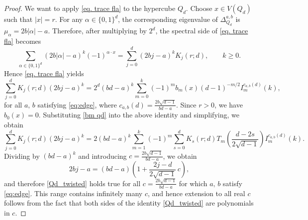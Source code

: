 \documentclass[reqno,10pt]{amsart}
\theoremstyle{definition}
\numberwithin{equation}{section}
\begin{document}
\begin{proof}
We want to apply \eqref{eq. trace fla} to the hypercube $Q_d$. Choose
$x\in V(Q_d)$ such that $|x|=r$.  For any
$\alpha\in\{0,1\}^d$, the corresponding eigenvalue of
$\Delta_{Q_d}^{a,b}$ is $\mu_\alpha=2b|\alpha|-a$. Therefore, after multiplying
by $2^d$, the spectral side of \eqref{eq. trace fla} becomes
\[
\sum_{\alpha\in\{0,1\}^d}
(2b|\alpha|-a)^k(-1)^{\alpha\cdot x}
=
\sum_{j=0}^{d}
(2bj-a)^kK_j(r;d),
\qquad k\ge0.
\]
Hence \eqref{eq. trace fla} yields 
\[
\sum_{j=0}^{d}
K_j(r;d)(2bj-a)^k
=
2^d(bd-a)^k
\sum_{m=0}^{k}
(-1)^m
b_m(x)
(d-1)^{-m/2}
I_m^{c_{a,b}(d)}(k),
\]
for all $a,\, b$ satisfying \eqref{eq:edge}, where $c_{a,b}(d)=\frac{2b\sqrt{d-1}}{bd-a}$. Since $r>0$, we have
$b_0(x)=0$. Substituting \eqref{bm qd} into the above identity and simplifying, we obtain
\[
\sum_{j=0}^{d}
K_j(r;d)(2bj-a)^k
=
2(bd-a)^k
\sum_{m=1}^{k}
(-1)^m
\sum_{s=0}^{d}
K_s(r;d)
T_m\!\left(
\frac{d-2s}{2\sqrt{d-1}}
\right)
I_m^{c_{a,b}(d)}(k).
\]
Dividing by $(bd-a)^k$ and introducing $c=\frac{2b\sqrt{d-1}}{bd-a}$, we obtain
\[
2bj-a
=
(bd-a)
\left(
1+\frac{2j-d}{2\sqrt{d-1}}\,c
\right),
\]
and therefore \eqref{Qd_twisted} holds true for all $c=\frac{2b\sqrt{d-1}}{bd-a}$ for which $a,\, b$ satisfy \eqref{eq:edge}. This range contains infinitely many $c$, and hence extension to all real $c$ follows from the fact that both sides of the identity  \eqref{Qd_twisted} are polynomials in $c$.
\end{proof}
\end{document}
